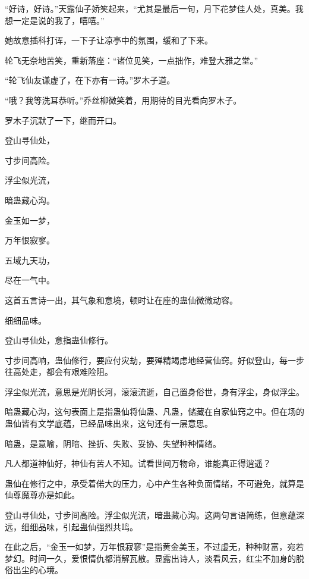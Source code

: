 
\begin{this_body}



“好诗，好诗。”天露仙子娇笑起来，“尤其是最后一句，月下花梦佳人处，真美。我想一定是说的我了，嘻嘻。”

她故意插科打诨，一下子让凉亭中的氛围，缓和了下来。

轮飞无奈地苦笑，重新落座：“诸位见笑，一点拙作，难登大雅之堂。”

“轮飞仙友谦虚了，在下亦有一诗。”罗木子道。

“哦？我等洗耳恭听。”乔丝柳微笑着，用期待的目光看向罗木子。

罗木子沉默了一下，继而开口。

登山寻仙处，

寸步间高险。

浮尘似光流，

暗蛊藏心沟。

金玉如一梦，

万年恨寂寥。

五域九天功，

尽在一气中。

这首五言诗一出，其气象和意境，顿时让在座的蛊仙微微动容。

细细品味。

登山寻仙处，意指蛊仙修行。

寸步间高响，蛊仙修行，要应付灾劫，要殚精竭虑地经营仙窍。好似登山，每一步往高处走，都会有艰难险阻。

浮尘似光流，意思是光阴长河，滚滚流逝，自己置身俗世，身有浮尘，身似浮尘。

暗蛊藏心沟，这句表面上是指蛊仙将仙蛊、凡蛊，储藏在自家仙窍之中。但在场的蛊仙皆有文学底蕴，已经品味出来，这句还有一层意思。

暗蛊，是意喻，阴暗、挫折、失败、妥协、失望种种情绪。

凡人都道神仙好，神仙有苦人不知。试看世间万物命，谁能真正得逍遥？

蛊仙在修行之中，承受着偌大的压力，心中产生各种负面情绪，不可避免，就算是仙尊魔尊亦是如此。

登山寻仙处，寸步间高险。浮尘似光流，暗蛊藏心沟。这两句言语简练，但意蕴深远，细细品味，引起蛊仙强烈共鸣。

在此之后，“金玉一如梦，万年恨寂寥”是指黄金美玉，不过虚无，种种财富，宛若梦幻。时间一久，爱恨情仇都消解瓦散。显露出诗人，淡看风云，红尘不加身的脱俗出尘的心境。


\end{this_body}
